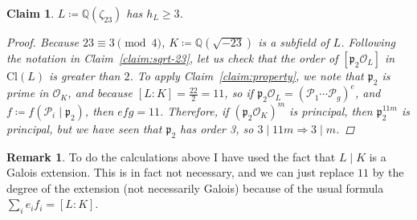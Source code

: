 \documentclass[11pt]{article}
\newtheorem{claim}[theorem]{Claim}
\theoremstyle{definition}
\newtheorem*{rk}{Remark}
\begin{document}
    \begin{claim}
        $L \coloneqq \mathbb{Q}(\zeta_{23})$ has $h_L \geq 3$.

        \begin{proof}
            Because $23 \equiv 3 \pmod 4$,
            $K \coloneqq \mathbb{Q}\left(\sqrt{-23}\right)$ is a subfield of $L$.
            Following the notation in Claim~\ref{claim:sqrt-23}, let us check
            that the order of $[\mathfrak{p}_2\mathcal{O}_L]$ in $\text{Cl}(L)$ is greater than $2$.
            To apply Claim~\ref{claim:property}, we note that $\mathfrak{p}_2$ is prime in $\mathcal{O}_K$,
            and because ${[L:K] = \frac{22}{2} = 11}$,
            so if $\mathfrak{p}_2\mathcal{O}_L = (\mathcal{P}_1 \cdots \mathcal{P}_g)^e$,
            and $f \coloneqq f(\mathcal{P}_i \mid \mathfrak{p}_2)$,
            then $efg = 11$.
            Therefore, if $(\mathfrak{p}_2\mathcal{O}_K)^m$ is principal,
            then $\mathfrak{p}_2^{11m}$ is principal,
            but we have seen that $\mathfrak{p}_2$ has order 3, so $3 \mid 11m \Rightarrow 3 \mid m$.
        \end{proof}

    \end{claim}

    \begin{rk}
        To do the calculations above I have used the fact that $L\mid K$ is a Galois extension.
        This is in fact not necessary, and we can just replace $11$ by the degree of the extension (not necessarily Galois)
        because of the usual formula $\sum_{i} e_i f_i = [L : K]$.
    \end{rk}
\end{document}
